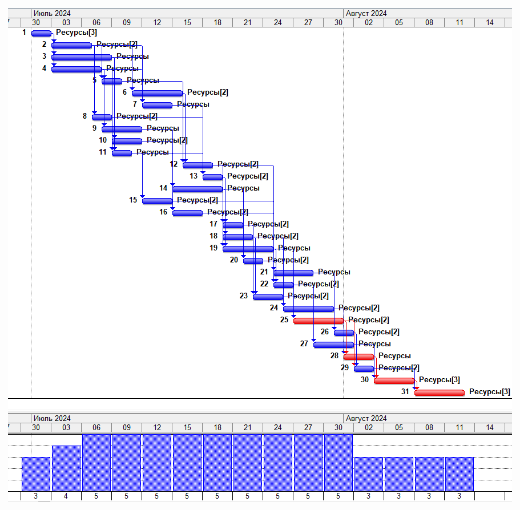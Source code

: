 \documentclass[14pt]{article}
\begin{document}
		\includegraphics[width=\textwidth]{../img/2b3_answer.png}\\ 
\end{document}
